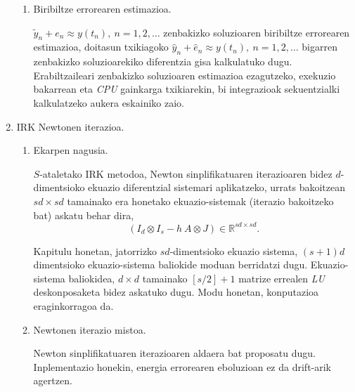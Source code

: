 \begin{enumerate}
\begin{enumerate}
\item Biribiltze errorearen estimazioa.

$\tilde{y}_n+e_n \approx y(t_n), \ n=1,2,\dots$ zenbakizko soluzioaren  biribiltze errorearen estimazioa, doitasun txikiagoko $\hat{y}_n+\hat{e}_n \approx y(t_n), \ n=1,2,\dots$ bigarren zenbakizko soluzioarekiko  diferentzia gisa kalkulatuko dugu.
Erabiltzaileari zenbakizko soluzioaren estimazioa ezagutzeko, exekuzio bakarrean  eta \emph{CPU} gainkarga txikiarekin, bi integrazioak sekuentzialki kalkulatzeko aukera eskainiko zaio. 

\end{enumerate}


\item IRK Newtonen iterazioa.

\begin{enumerate}
\item Ekarpen nagusia.

$S$-ataletako IRK metodoa,  Newton sinplifikatuaren iterazioaren bidez $d$-dimentsioko ekuazio diferentzial  sistemari aplikatzeko, urrats bakoitzean $sd \times sd$ tamainako era honetako ekuazio-sistemak (iterazio bakoitzeko bat) askatu behar dira,
\begin{equation*}
(I_d \otimes I_s- h \ A \otimes J) \in \mathbb{R}^{sd \times sd}.
\end{equation*} 

Kapitulu honetan, jatorrizko $sd$-dimentsioko ekuazio sistema, $(s+1)d$ dimentsioko ekuazio-sistema baliokide moduan berridatzi dugu. Ekuazio-sistema baliokidea,  $d \times d$ tamainako $[s/2]+1$ matrize errealen \emph{LU} deskonposaketa bidez askatuko dugu. Modu honetan, konputazioa eraginkorragoa da.



\item Newtonen iterazio mistoa.

Newton sinplifikatuaren iterazioaren aldaera bat proposatu dugu. Inplementazio honekin, energia errorearen eboluzioan ez da drift-arik agertzen. 



\end{enumerate}
  


\end{enumerate}
